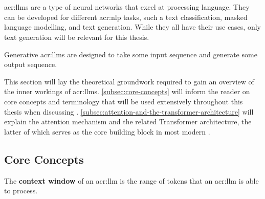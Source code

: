 





\section[Large Language Models]{}

\glspl{acr:llm} are a type of neural networks that excel at processing language. They can be developed for different \gls{acr:nlp} tasks, such a text classification, masked language modelling, and text generation. While they all have their use cases, only text generation will be relevant for this thesis.

Generative \glspl{acr:llm} are designed to take some input sequence and generate some output sequence.

This section will lay the theoretical groundwork required to gain an overview of the inner workings of \glspl{acr:llm}. \autoref{subsec:core-concepts} will inform the reader on core concepts and terminology that will be used extensively throughout this thesis when discussing . \autoref{subsec:attention-and-the-transformer-architecture} will explain the attention mechanism and the related Transformer architecture, the latter of which serves as the core building block in most modern .


\subsection{Core Concepts}
\label{subsec:core-concepts}

The \textbf{context window} of an \acrshort{acr:llm} is the range of tokens that an \acrshort{acr:llm} is able to process.

